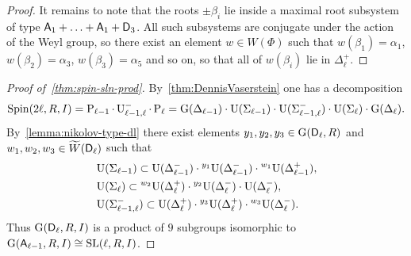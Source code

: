 \begin{proof}
It remains to note that the roots $\pm\beta_i$ lie inside a maximal root subsystem of type $\mathsf{A}_1+\ldots+\mathsf{A}_1+\mathsf{D}_3$. All such subsystems are conjugate under the action of the Weyl group, so there exist an element $w\in W(\Phi)$ such that $w(\beta_1)=\alpha_1$, $w(\beta_2)=\alpha_3$, $w(\beta_3)=\alpha_5$ and so on, so that all of $w(\beta_i)$ lie in $\Delta_\ell^+$.
\end{proof}
\begin{proof}[Proof of~\cref{thm:spin-sln-prod}]
By~\cref{thm:DennisVaserstein} one has a decomposition
\[ \operatorname{Spin}(2\ell,R,I) = \operatorname{P}_{\ell-1}\cdot\operatorname{U}_{\ell-1,\ell}^-\cdot\operatorname{P}_{\ell} = \operatorname{G}(\Delta_{\ell-1})\cdot\operatorname{U}(\Sigma_{\ell-1})\cdot\operatorname{U}(\Sigma_{\ell-1,\ell}^-)\cdot\operatorname{U}(\Sigma_{\ell})\cdot\operatorname{G}(\Delta_\ell). \]
By~\cref{lemma:nikolov-type-dl} there exist elements $y_1,y_2,y_3\in\operatorname{G}(\mathsf{D}_\ell,R)$ and $w_1,w_2,w_3\in\widetilde{W}(\mathsf{D}_\ell)$ such that
\begin{align*}
& \operatorname{U}(\Sigma_{\ell-1}) \subset \operatorname{U}(\Delta_{\ell-1}^-) \cdot {}^{y_1}\!\operatorname{U}(\Delta_{\ell-1}^-) \cdot {}^{w_1}\!\operatorname{U}(\Delta_{\ell-1}^+), \\
& \operatorname{U}(\Sigma_\ell) \subset {}^{w_2}\!\operatorname{U}(\Delta_\ell^+) \cdot {}^{y_2}\!\operatorname{U}(\Delta_\ell^-) \cdot \operatorname{U}(\Delta_\ell^-), \\
& \operatorname{U}(\Sigma_{\ell-1,\ell}^-) \subset \operatorname{U}(\Delta_\ell^+) \cdot {}^{y_3}\!\operatorname{U}(\Delta_\ell^+) \cdot {}^{w_3}\!\operatorname{U}(\Delta_\ell^-).
\end{align*}
Thus $\operatorname{G}(\mathsf{D}_\ell,R,I)$ is a product of $9$ subgroups isomorphic to $\operatorname{G}(\mathsf{A}_{\ell-1},R,I)\cong\operatorname{SL}(\ell,R,I)$.
\end{proof}